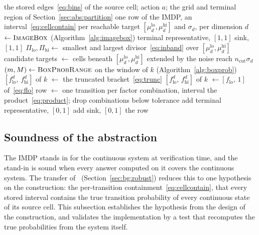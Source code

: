 \documentclass[11pt,a4paper]{article}
\theoremstyle{plain}
\theoremstyle{remark}
\begin{document}
	\begin{algorithm}[H]
		\caption{$\textsc{RowIntervals}$: the transition intervals of one source cell under one action.}
		\label{alg:intervals}
		\begin{algorithmic}[1]
			\Require the stored edges~\eqref{eq:bins} of the source cell; action $a$; the grid and terminal region of Section~\ref{sec:abs:partition}
			\Ensure one row of the IMDP, an interval~\eqref{eq:cellcontain} per reachable target
			\State $[\mu_d^{\text{lo}}, \mu_d^{\text{hi}}]$ and $\sigma_d$, per dimension $d$ $\gets \textsc{ImageBox}$ (Algorithm~\ref{alg:imagebox})
			 \Return terminal representative, $[1,1]$ \EndIf
			 \Return sink, $[1,1]$ \EndIf
			\State $\Pi_{\text{lo}}, \Pi_{\text{hi}} \gets$ smallest and largest divisor~\eqref{eq:inband} over $[\mu_d^{\text{lo}}, \mu_d^{\text{hi}}]$
			\State candidate targets $\gets$ cells beneath $[\mu_d^{\text{lo}}, \mu_d^{\text{hi}}]$ extended by the noise reach $n_{\mathrm{cut}}\sigma_d$
			\State $(m, M) \gets \textsc{BoxProbRange}$ on the window of $k$ (Algorithm~\ref{alg:boxprob})
			\State $[f^d_{\text{lo}},\, f^d_{\text{hi}}]$ of $k$ $\gets$ the truncated bracket~\eqref{eq:trunc}
			\EndFor
			\EndFor
			\State $[f^d_{\text{lo}},\, f^d_{\text{hi}}]$ of $k$ $\gets [f_{\text{lo}},\, 1]$ of~\eqref{eq:flo}
			\EndFor
			\EndFor
			\State row $\gets$ one transition per factor combination, interval the product~\eqref{eq:product}; drop combinations below tolerance
			 add terminal representative, $[0,1]$ \EndIf
			 add sink, $[0,1]$ \EndIf
			\State \Return the row
		\end{algorithmic}
	\end{algorithm}
	
	\subsection{Soundness of the abstraction}
	\label{sec:abs:sound}
	
	The IMDP stands in for the continuous system at verification time,
	and the stand-in is sound when every answer computed on it covers
	the continuous system. The transfer
	of~\cite{LAB15} (Section~\ref{sec:bg:robust}) reduces this to one
	hypothesis on the construction: the per-transition
	containment~\eqref{eq:cellcontain}, that every stored interval
	contains the true transition probability of every continuous
	state of its source cell. This subsection establishes the
	hypothesis from the design of the construction, and validates
	the implementation by a test that recomputes the true
	probabilities from the system itself.
	
\end{document}

